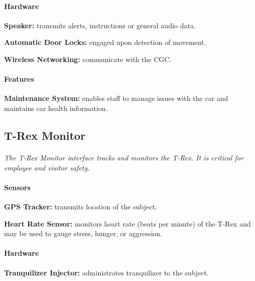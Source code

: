 \documentclass[12pt]{article}
\begin{document}
    \paragraph{Hardware}
    \begin{list}{}{}
        \item \textbf{Speaker:} transmits alerts, instructions or general audio data.
        \item \textbf{Automatic Door Locks:} engaged upon detection of movement. %
        \item \textbf{Wireless Networking:} communicate with the CGC.
    \end{list}
    
    \paragraph{Features}
    \begin{list}{}{}
        \item \textbf{Maintenance System:} enables staff to manage issues with the car 
        and     maintains car health information.
    \end{list}

    \subsection{T-Rex Monitor}
    \paragraph{} \textit{The T-Rex Monitor interface tracks and monitors the T-Rex. It is 
    critical for employee and visitor safety.}
    \paragraph{Sensors}
    \begin{list}{}{}
        \item \textbf{GPS Tracker:} transmits location of the subject.
        \item \textbf{Heart Rate Sensor:} monitors heart rate (beats per minute) of the T-Rex
        and may be used to gauge stress, hunger, or aggression.
    \end{list}
        
    \paragraph{Hardware}
    \begin{list}{}{}
        \item \textbf{Tranquilizer Injector:} administrates tranquilizer to the subject.
    \end{list}
\end{document}
